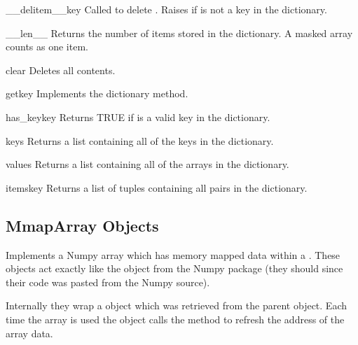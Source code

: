 \begin{methoddesc}[ArrayDict]{__delitem__}{key}
Called to delete .  Raises  if
 is not a key in the dictionary.
\end{methoddesc}

\begin{methoddesc}[ArrayDict]{__len__}{}
Returns the number of items stored in the dictionary.  A masked array
counts as one item.
\end{methoddesc}

\begin{methoddesc}[ArrayDict]{clear}{}
Deletes all contents.
\end{methoddesc}

\begin{methoddesc}[ArrayDict]{get}{key }
Implements the dictionary  method.
\end{methoddesc}

\begin{methoddesc}[ArrayDict]{has_key}{key}
Returns TRUE if  is a valid key in the dictionary.
\end{methoddesc}

\begin{methoddesc}[ArrayDict]{keys}{}
Returns a list containing all of the keys in the dictionary.
\end{methoddesc}

\begin{methoddesc}[ArrayDict]{values}{}
Returns a list containing all of the arrays in the dictionary.
\end{methoddesc}

\begin{methoddesc}[ArrayDict]{items}{key}
Returns a list of tuples containing all  pairs in
the dictionary.
\end{methoddesc}

\subsection{MmapArray Objects}

Implements a Numpy array which has memory mapped data within a
.  These objects act exactly like the 
object from the Numpy package (they should since their code was pasted
from the Numpy source).

Internally they wrap a  object which was retrieved from
the parent  object.  Each time the array is used the
object calls the   method to refresh
the address of the array data.

